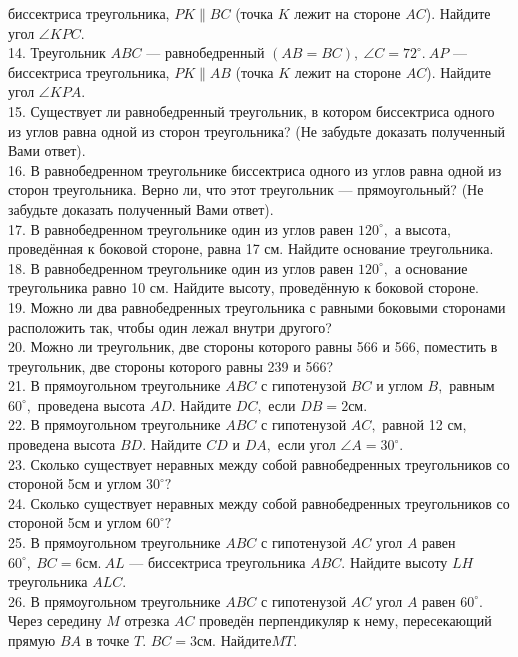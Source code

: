 биссектриса треугольника, $PK\parallel BC$ (точка $K$ лежит на стороне $AC$). Найдите угол $\angle KPC.$\\
14. Треугольник $ABC$ --- равнобедренный $(AB=BC),\ \angle C=72^\circ.\ AP$ ---
биссектриса треугольника, $PK\parallel AB$ (точка $K$ лежит на стороне $AC$). Найдите угол $\angle KPA.$\\
15. Существует ли равнобедренный треугольник, в котором биссектриса одного из углов равна одной из сторон треугольника? (Не забудьте доказать полученный Вами ответ).\\
16. В равнобедренном треугольнике биссектриса одного из углов равна одной из сторон треугольника. Верно ли, что этот треугольник --- прямоугольный? (Не забудьте доказать полученный Вами ответ).\\
17. В равнобедренном треугольнике один из углов равен $120^\circ,$ а высота, проведённая к боковой стороне, равна 17 см. Найдите основание треугольника.\\
18. В равнобедренном треугольнике один из углов равен $120^\circ,$ а основание треугольника равно 10 см. Найдите высоту, проведённую к боковой стороне.\\
19. Можно ли два равнобедренных треугольника с равными боковыми сторонами расположить так, чтобы один лежал внутри другого?\\
20. Можно ли треугольник, две стороны которого равны 566 и 566, поместить в треугольник, две стороны которого равны 239 и 566?\\
21. В прямоугольном треугольнике $ABC$ с гипотенузой $BC$ и углом $B,$ равным $60^\circ,$ проведена высота $AD.$ Найдите $DC,$ если $DB=2\text{см}.$\\
22. В прямоугольном треугольнике $ABC$ с гипотенузой $AC,$ равной 12 см, проведена высота $BD.$ Найдите $CD$ и $DA,$ если угол $\angle A=30^\circ.$\\
23. Сколько существует неравных между собой равнобедренных треугольников со стороной 5см и углом $30^\circ ?$\\
24. Сколько существует неравных между собой равнобедренных треугольников со стороной 5см и углом $60^\circ ?$\\
25. В прямоугольном треугольнике $ABC$ с гипотенузой $AC$ угол $A$ равен $60^\circ,\ BC=6\text{см}.\ AL$ --- биссектриса треугольника $ABC.$ Найдите высоту $LH$ треугольника $ALC.$\\
26. В прямоугольном треугольнике $ABC$ с гипотенузой $AC$ угол $A$ равен $60^\circ.$ Через середину $M$ отрезка $AC$ проведён перпендикуляр к нему, пересекающий прямую $BA$ в точке $T.$ $BC=3\text{см}.$ Найдите$MT.$\\
